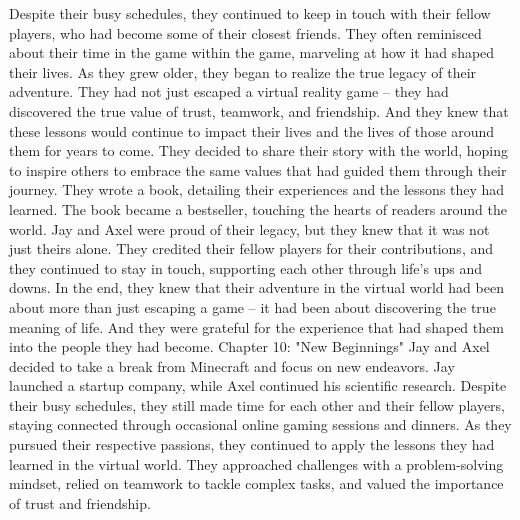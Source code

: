 \documentclass{book}%
\begin{document}
\newline%
Despite their busy schedules, they continued to keep in touch with their fellow players, who had become some of their closest friends. They often reminisced about their time in the game within the game, marveling at how it had shaped their lives.\newline%
\newline%
As they grew older, they began to realize the true legacy of their adventure. They had not just escaped a virtual reality game – they had discovered the true value of trust, teamwork, and friendship. And they knew that these lessons would continue to impact their lives and the lives of those around them for years to come.\newline%
\newline%
They decided to share their story with the world, hoping to inspire others to embrace the same values that had guided them through their journey. They wrote a book, detailing their experiences and the lessons they had learned. The book became a bestseller, touching the hearts of readers around the world.\newline%
\newline%
Jay and Axel were proud of their legacy, but they knew that it was not just theirs alone. They credited their fellow players for their contributions, and they continued to stay in touch, supporting each other through life's ups and downs.\newline%
\newline%
In the end, they knew that their adventure in the virtual world had been about more than just escaping a game – it had been about discovering the true meaning of life. And they were grateful for the experience that had shaped them into the people they had become.%
Chapter 10: "New Beginnings"\newline%
\newline%
Jay and Axel decided to take a break from Minecraft and focus on new endeavors. Jay launched a startup company, while Axel continued his scientific research.\newline%
\newline%
Despite their busy schedules, they still made time for each other and their fellow players, staying connected through occasional online gaming sessions and dinners.\newline%
\newline%
As they pursued their respective passions, they continued to apply the lessons they had learned in the virtual world. They approached challenges with a problem{-}solving mindset, relied on teamwork to tackle complex tasks, and valued the importance of trust and friendship.\newline%
\end{document}
